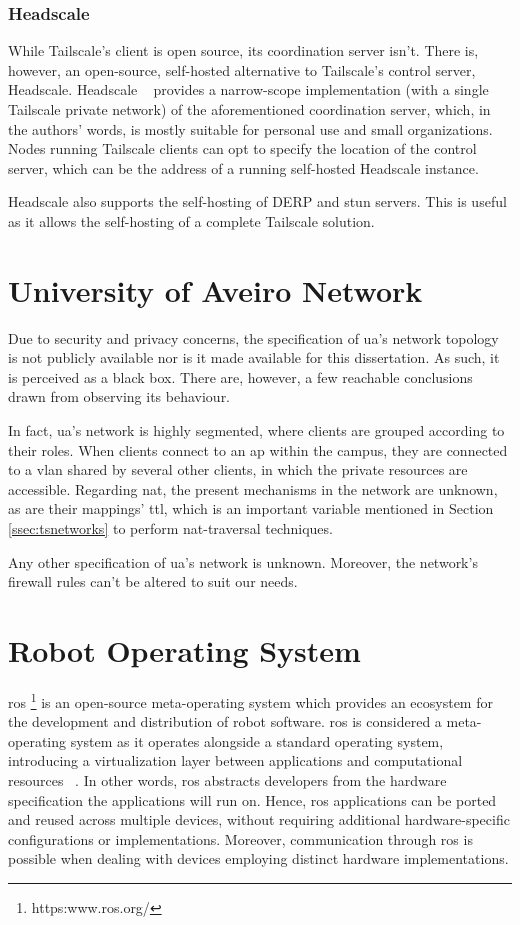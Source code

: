 \documentclass[11pt,twoside,a4paper]{report}
\begin{document}
\subsubsection{Headscale}
\label{sec:hs}

While Tailscale's client is open source, its coordination server isn't. There is, however, an open-source, self-hosted alternative to Tailscale's control server, Headscale. Headscale ~\cite{headscale2023online} provides a narrow-scope implementation (with a single Tailscale private network) of the aforementioned coordination server, which, in the authors' words, is mostly suitable for personal use and small organizations. Nodes running Tailscale clients can opt to specify the location of the control server, which can be the address of a running self-hosted Headscale instance.

Headscale also supports the self-hosting of \ac{DERP} and \ac{stun} servers. This is useful as it allows the self-hosting of a complete Tailscale solution.

\section{University of Aveiro Network}
\label{sec:uanet}

Due to security and privacy concerns, the specification of \ac{ua}'s network topology is not publicly available nor is it made available for this dissertation. As such, it is perceived as a black box. There are, however, a few reachable conclusions drawn from observing its behaviour.

In fact, \ac{ua}'s network is highly segmented, where clients are grouped according to their roles. When clients connect to an \ac{ap} within the campus, they are connected to a \ac{vlan} shared by several other clients, in which the private resources are accessible. Regarding \ac{nat}, the present mechanisms in the network are unknown, as are their mappings' \ac{ttl}, which is an important variable mentioned in Section \ref{ssec:tsnetworks} to perform \ac{nat}-traversal techniques.

Any other specification of \ac{ua}'s network is unknown. Moreover, the network's firewall rules can't be altered to suit our needs.

\section{Robot Operating System}

\ac{ros} \footnote{https:www.ros.org/} is an open-source meta-operating system which provides an ecosystem for the development and distribution of robot software. \ac{ros} is considered a meta-operating system as it operates alongside a standard operating system, introducing a virtualization layer between applications and computational resources ~\cite{pyo_ros_en_2017}. In other words, \ac{ros} abstracts developers from the hardware specification the applications will run on. Hence, \ac{ros} applications can be ported and reused across multiple devices, without requiring additional hardware-specific configurations or implementations. Moreover, communication through \ac{ros} is possible when dealing with devices employing distinct hardware implementations.
\end{document}
